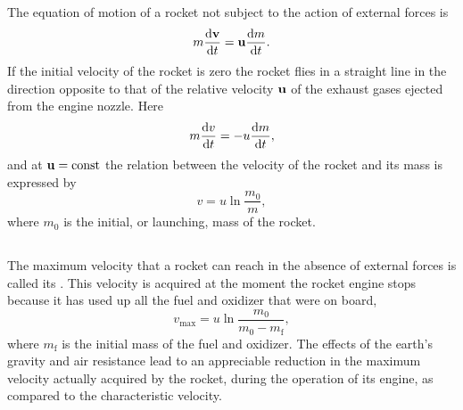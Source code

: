 \subsection{}\label{2.6.3} The equation of motion of a rocket not subject to the action of external forces is
\begin{equation*}%
m \dv{\vb{v}}{t} = \vb{u} \dv{m}{t}.
\end{equation*}
If the initial velocity of the rocket is zero the rocket flies in a straight line in the direction opposite to that of the relative velocity $\vb{u}$ of the exhaust gases ejected from the engine nozzle. Here
\begin{equation*}%
m \dv{v}{t} = -u \dv{m}{t},
\end{equation*}
and at $\vb{u} = \textrm{const}$ the relation between the velocity of the rocket and its mass is expressed by 
\begin{equation*}%
v = u \ln \frac{m_{0}}{m},
\end{equation*}
where $m_{0}$ is the initial, or launching, mass of the rocket. 

\subsection{}\label{2.6.4} The maximum velocity that a rocket can reach in the absence of external forces is called its . This velocity is acquired at the moment the rocket engine stops because it has used up all the fuel and oxidizer that were on board,
\begin{equation*}%
v_{\textrm{max}}=  u \ln  \frac{m_{0}}{m_{0}-m_{\textrm{f}}},
\end{equation*}
where $m_{\textrm{f}}$ is the initial mass of the fuel and oxidizer.
The effects of the earth's gravity and air resistance lead to an appreciable reduction in the maximum velocity actually ac­quired by the rocket, during the operation of its engine, as com­pared to the characteristic velocity.

